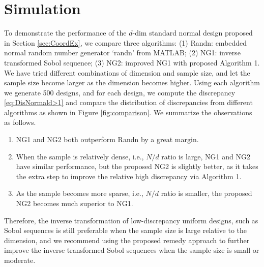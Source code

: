 \documentclass[graybox]{svmult}
\begin{document}
\section{Simulation}

To demonstrate the performance of the $d$-dim standard normal design proposed in Section \ref{sec:CoordEx}, we compare three algorithms: (1) Randn: embedded normal random number generator `randn' from MATLAB;  (2) NG1: inverse transformed Sobol sequence; (3) NG2: improved NG1 with proposed Algorithm 1.  
We have tried different combinations of dimension and sample size, and let the sample size become larger as the dimension becomes higher. 
Using each algorithm we generate 500 designs, and for each design, we compute the discrepancy \eqref{eq:DisNormald>1} and compare the distribution of discrepancies from different algorithms as shown in Figure \ref{fig:comparison}. 
We summarize the observations as follows. 
\begin{enumerate}
\item
NG1 and NG2 both outperform Randn by a great margin.
\item 
When the sample is relatively dense, i.e., $N/d$ ratio is large, NG1 and NG2 have similar performance, but the proposed NG2 is slightly better, as it takes the extra step to improve the relative high discrepancy via Algorithm 1.  
\item
As the sample becomes more sparse, i.e., $N/d$ ratio is smaller, the proposed NG2 becomes much superior to NG1.
\end{enumerate}
Therefore, the inverse transformation of low-discrepancy uniform designs, such as Sobol sequences is still preferable when the sample size is large relative to the dimension, and we recommend using the proposed remedy approach to further improve the inverse transformed Sobol sequences when the sample size is small or moderate. 
\end{document}
